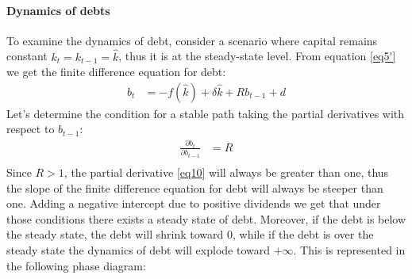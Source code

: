 \documentclass[12pt]{article}
\begin{document}
\paragraph{Dynamics of debts}
To examine the dynamics of debt, consider a scenario where capital remains constant \(k_t=k_{t-1}=\widehat{k}\), thus it is at the
steady-state level. From equation \ref{eq5'} we get the finite difference equation for debt:
\begin{align}
    b_{t} &=  - f(\widehat{k}) + \delta \widehat{k} + R  b_{t-1} + d   \label{eq10}
\end{align}
Let's determine the condition for a stable path taking the partial derivatives with respect to \(b_{t-1}\):
\begin{align}
    \frac{\partial{b_t}}{\partial b_{t-1}} &= R  \label{eq11} \\
\end{align}
Since \(R >1\), the partial derivative \ref{eq10} will always be greater than one, thus the slope of the finite
difference equation for debt will always be steeper than one. Adding a negative intercept due to positive dividends we
get that under those conditions there exists a steady state of debt. Moreover, if the debt is below the steady state, the
debt will shrink toward 0, while if the debt is over the steady state the dynamics of debt will explode toward
\(+\infty\). This is represented in the following phase diagram:
\end{document}

